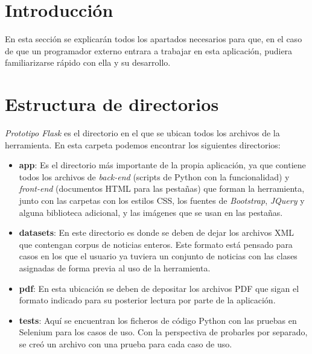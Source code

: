 
\section{Introducción}

En esta sección se explicarán todos los apartados necesarios para que, en el caso de que un programador externo entrara a trabajar en esta aplicación, pudiera familiarizarse rápido con ella y su desarrollo.

\section{Estructura de directorios}

\emph{Prototipo Flask} es el directorio en el que se ubican todos los archivos de la herramienta. En esta carpeta podemos encontrar los siguientes directorios:

\begin{itemize}

\item \textbf{app}: Es el directorio más importante de la propia aplicación, ya que contiene todos los archivos de \emph{back-end} (scripts de Python con la funcionalidad) y \emph{front-end} (documentos HTML para las pestañas) que forman la herramienta, junto con las carpetas con los estilos CSS, los fuentes de \emph{Bootstrap}, \emph{JQuery} y alguna biblioteca adicional, y las imágenes que se usan en las pestañas.

\item \textbf{datasets}: En este directorio es donde se deben de dejar los archivos XML que contengan corpus de noticias enteros. Este formato está pensado para casos en los que el usuario ya tuviera un conjunto de noticias con las clases asignadas de forma previa al uso de la herramienta.

\item \textbf{pdf}: En esta ubicación se deben de depositar los archivos PDF que sigan el formato indicado para su posterior lectura por parte de la aplicación.

\item \textbf{tests}: Aquí se encuentran los ficheros de código Python con las pruebas en Selenium para los casos de uso. Con la perspectiva de probarles por separado, se creó un archivo con una prueba para cada caso de uso.

\end{itemize}

